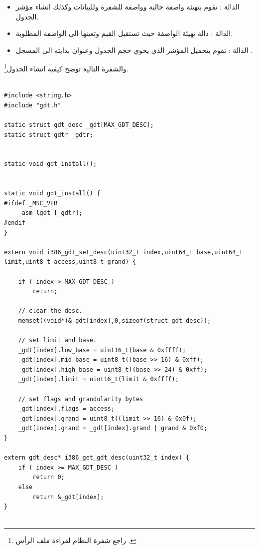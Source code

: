 \documentclass[document.tex]{subfiles}
\begin{document}
\begin{itemize}
\item الدالة : تقوم بتهيئة واصفة خالية وواصفة للشفرة وللبيانات وكذلك انشاء مؤشر الجدول.
\item الدالة : دالة تهيئة الواصفة حيث تستقبل القيم وتعينها الى الواصفة المطلوبة.
\item الدالة : تقوم بتحميل المؤشر الذي يحوي حجم الجدول وعنوان بدايته الى المسجل .  
\end{itemize}
والشفرة التالية توضح كيفية انشاء الجدول\footnote{راجع شفرة النظام لقراءة ملف الرأس .}.
\begin{english}

\lstset{numberstyle=\tiny,numbers=left,stepnumber=1,numbersep=5pt,tabsize=2,extendedchars=true,breaklines=true,frame=b,showspaces=false, showtabs=false,xleftmargin=10pt,framexleftmargin=10pt,framexrightmargin=5pt,framexbottommargin=4pt,showstringspaces=false,language=C++}

\begin{lstlisting}[label=gdt_c,caption=\en{hal/gdt.cpp:Install GDT}]

#include <string.h>
#include "gdt.h"
 
static struct gdt_desc _gdt[MAX_GDT_DESC];
static struct gdtr _gdtr;


static void gdt_install();


static void gdt_install() {
#ifdef _MSC_VER
	_asm lgdt [_gdtr];
#endif
}

extern void i386_gdt_set_desc(uint32_t index,uint64_t base,uint64_t limit,uint8_t access,uint8_t grand) {
	
	if ( index > MAX_GDT_DESC )
		return;
		
	// clear the desc.
	memset((void*)&_gdt[index],0,sizeof(struct gdt_desc));
	
	// set limit and base.
	_gdt[index].low_base = uint16_t(base & 0xffff);
	_gdt[index].mid_base = uint8_t((base >> 16) & 0xff);
	_gdt[index].high_base = uint8_t((base >> 24) & 0xff);
	_gdt[index].limit = uint16_t(limit & 0xffff);
	
	// set flags and grandularity bytes
	_gdt[index].flags = access;
	_gdt[index].grand = uint8_t((limit >> 16) & 0x0f);
	_gdt[index].grand = _gdt[index].grand | grand & 0xf0;
}

extern gdt_desc* i386_get_gdt_desc(uint32_t index) {
	if ( index >= MAX_GDT_DESC )
		return 0;
	else
		return &_gdt[index];
}


\end{lstlisting}
\end{english}
\end{document}

